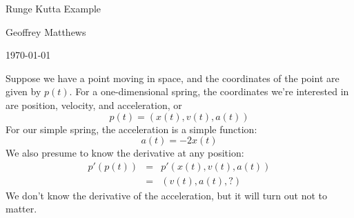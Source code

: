 \documentclass{article}
\begin{document}
\centerline{\Large Runge Kutta Example}

\centerline{\large Geoffrey Matthews}

\centerline{\today}


Suppose we have a point moving in space, and the coordinates of the
point are given by $p(t)$.  For a one-dimensional spring, the
coordinates we're interested in are position, velocity, and
acceleration, or 
\[
p(t) = (x(t), v(t), a(t))
\]
For our simple spring, the acceleration is a simple function:
\[
a(t) = -2x(t)
\]
We also presume to know the derivative at any position:
\begin{eqnarray*}
p'(p(t)) &=& p'(x(t), v(t), a(t))\\
         &=& (v(t), a(t), ?)
\end{eqnarray*}
We don't know the derivative of the acceleration, but it will turn out
not to matter.
\end{document}
